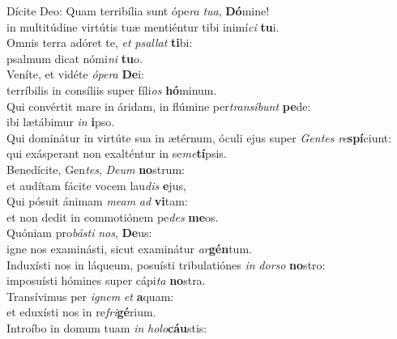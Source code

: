 \evenverse Dícite Deo: Quam terribília sunt ópe\textit{ra} \textit{tu}\textit{a}, \textbf{Dó}mine!~\*\\
\evenverse in multitúdine virtútis tuæ mentiéntur tibi inimí\textit{ci} \textbf{tu}i.\\
\oddverse Omnis terra adóret te, \textit{et} \textit{psal}\textit{lat} \textbf{ti}bi:~\*\\
\oddverse psalmum dicat nómi\textit{ni} \textbf{tu}o.\\
\evenverse Veníte, et vidéte \textit{ó}\textit{pe}\textit{ra} \textbf{De}i:~\*\\
\evenverse terríbilis in consíliis super fíli\textit{os} \textbf{hó}minum.\\
\oddverse Qui convértit mare in áridam, in flúmine per\textit{tran}\textit{sí}\textit{bunt} \textbf{pe}de:~\*\\
\oddverse ibi lætábimur \textit{in} \textbf{i}pso.\\
\evenverse Qui dominátur in virtúte sua in ætérnum, óculi ejus super \textit{Gen}\textit{tes} \textit{re}\textbf{spí}ciunt:~\*\\
\evenverse qui exásperant non exalténtur in se\textit{me}\textbf{tí}psis.\\
\oddverse Benedícite, Gen\textit{tes}, \textit{De}\textit{um} \textbf{no}strum:~\*\\
\oddverse et audítam fácite vocem lau\textit{dis} \textbf{e}jus,\\
\evenverse Qui pósuit ánimam \textit{me}\textit{am} \textit{ad} \textbf{vi}tam:~\*\\
\evenverse et non dedit in commotiónem pe\textit{des} \textbf{me}os.\\
\oddverse Quóniam pro\textit{bá}\textit{sti} \textit{nos}, \textbf{De}us:~\*\\
\oddverse igne nos examinásti, sicut examinátur \textit{ar}\textbf{gén}tum.\\
\evenverse Induxísti nos in láqueum, posuísti tribulatiónes \textit{in} \textit{dor}\textit{so} \textbf{no}stro:~\*\\
\evenverse imposuísti hómines super cápi\textit{ta} \textbf{no}stra.\\
\oddverse Transívimus per \textit{i}\textit{gnem} \textit{et} \textbf{a}quam:~\*\\
\oddverse et eduxísti nos in re\textit{fri}\textbf{gé}rium.\\
\evenverse Introíbo in domum tuam \textit{in} \textit{ho}\textit{lo}\textbf{cáu}stis:~\*\\
